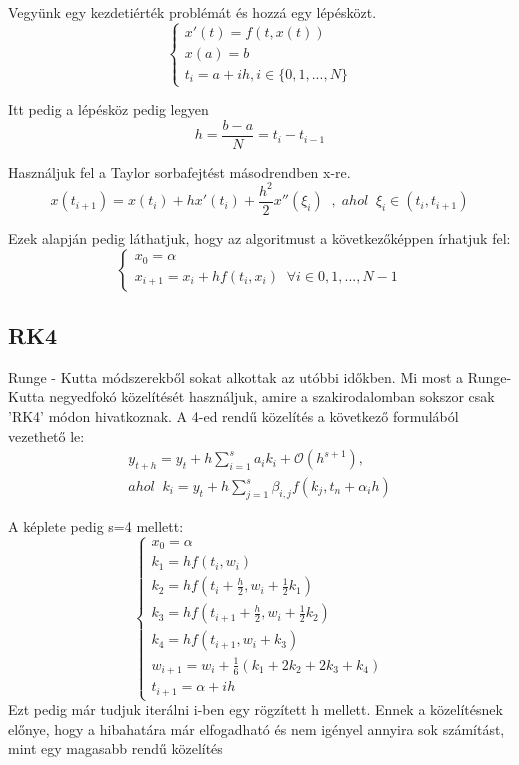 \documentclass{article}
\theoremstyle{definition}
\theoremstyle{theorem}
\begin{document}
Vegyünk egy kezdetiérték problémát és hozzá egy lépésközt.
\begin{equation*}
    \begin{cases}
       x'(t) = f(t,x(t))\\
       x(a) = b \\
       t_i = a + ih , i \in \{0,1,...,N\}
    \end{cases}
\end{equation*}

Itt pedig a lépésköz pedig legyen \[h = \frac{b-a}{N} = t_i - t_{i-1} \]

Használjuk fel a Taylor sorbafejtést másodrendben x-re.
\begin{equation*}
    x(t_{i+1}) = x(t_i) + h x'(t_i) + \frac{h^2}{2} x''(\xi_i) \;\;,\;ahol \;\;\xi _i \in (t_i, t_{i+1})
\end{equation*}

Ezek alapján pedig láthatjuk, hogy az algoritmust a következőképpen írhatjuk fel:
\begin{equation*}
    \begin{cases}
        x_0 = \alpha \\
        x_{i+1} = x_i + h f(t_i,x_i) \;\;\forall i \in{0,1,...,N-1}
    \end{cases}
\end{equation*}
\subsection{RK4}
Runge - Kutta módszerekből sokat alkottak az utóbbi időkben. Mi most a Runge-Kutta negyedfokó közelítését használjuk, amire a szakirodalomban sokszor csak 'RK4' módon hivatkoznak. A 4-ed rendű közelítés a következő formulából vezethető le:
\begin{equation*}
\begin{split}
      y_{t+h} = y_t + h \sum_{i=1}^{s} a_i k_i + \mathcal{O}(h^{s+1}),\\
      ahol\;\;k_i = y_t + h \sum_{j=1}^{s} \beta_{i,j} f(k_j,t_n + \alpha_ih)
\end{split}
\end{equation*}

A képlete pedig s=4 mellett:
\begin{equation*}
\begin{cases}
        x_0 = \alpha \\
        k_1 = h f(t_i,w_i) \\
        k_2 = h f(t_i + \frac{h}{2}, w_i + \frac{1}{2} k_1) \\
        k_3 = h f(t_{i + 1} + \frac{h}{2}, w_i + \frac{1}{2} k_2) \\
        k_4 = h f(t_{i + 1}, w_i + k_3)\\
        w_{i+1} = w_i + \frac{1}{6}(k_1 + 2k_2 + 2k_3 + k_4)\\
        t_{i+1} = \alpha + ih
\end{cases}
\end{equation*}
Ezt pedig már tudjuk iterálni i-ben egy rögzített h mellett. Ennek a közelítésnek előnye, hogy a hibahatára már elfogadható és nem igényel annyira sok számítást, mint egy magasabb rendű közelítés
\end{document}
